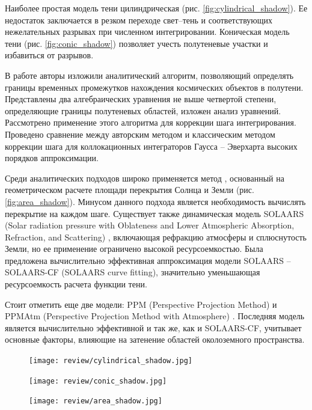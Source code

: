 Наиболее простая модель тени цилиндрическая (рис. \ref{fig:cylindrical_shadow}). Ее недостаток заключается в резком переходе
свет--тень и соответствующих нежелательных разрывах при численном интегрировании.
Коническая модель тени (рис. \ref{fig:conic_shadow}) позволяет учесть полутеневые участки и избавиться от разрывов.

В работе \cite{kuznetsov2024} авторы изложили аналитический алгоритм, позволяющий определять границы временных промежутков нахождения космических объектов в полутени. Представлены
два алгебраических уравнения не выше четвертой степени, определяющие границы полутеневых областей, изложен анализ уравнений. Рассмотрено применение этого
алгоритма для коррекции шага интегрирования. Проведено сравнение между авторским методом и классическим методом коррекции шага для коллокационных интеграторов
Гаусса – Эверхарта высоких порядков аппроксимации.

Среди аналитических подходов широко применяется метод \cite{zhang2019}, основанный на геометрическом
расчете площади перекрытия Солнца и Земли (рис. \ref{fig:area_shadow}). Минусом данного подхода является необходимость
вычислять перекрытие на каждом шаге. 
Существует также динамическая модель SOLAARS 
(Solar radiation pressure with Oblateness and Lower Atmospheric Absorption, Refraction, and Scattering) \cite{Robertson2014}, включающая рефракцию атмосферы и
сплюснутость Земли, но ее применение ограничено высокой ресурсоемкостью. Была предложена
вычислительно эффективная аппроксимация модели SOLAARS -- SOLAARS-СF (SOLAARS curve fitting), значительно уменьшающая
ресурсоемкость расчета функции тени.

Стоит отметить еще две модели: PPM (Perspective
Projection Method) \cite{Oswald1982} и PPMAtm (Perspective Projection Method with Atmosphere) \cite{Li2019}.
Последняя модель является вычислительно эффективной и так же, как и SOLAARS-CF,
учитывает основные факторы, влияющие на затенение областей околоземного пространства.

\begin{figure}[ht]
  \begin{minipage}[c]{0.68\textwidth}
    \centering
    \texttt{[image: review/cylindrical\_shadow.jpg]}
    \label{fig:cylindrical_shadow}
    
    \vspace{0.5cm} %
    
    \texttt{[image: review/conic\_shadow.jpg]}
    \label{fig:conic_shadow}
  \end{minipage}
  \hfill
  \begin{minipage}[c]{0.3\textwidth}
    \centering
    \texttt{[image: review/area\_shadow.jpg]}
    \label{fig:area_shadow}
  \end{minipage}

  \label{fig:combined}
\end{figure}

